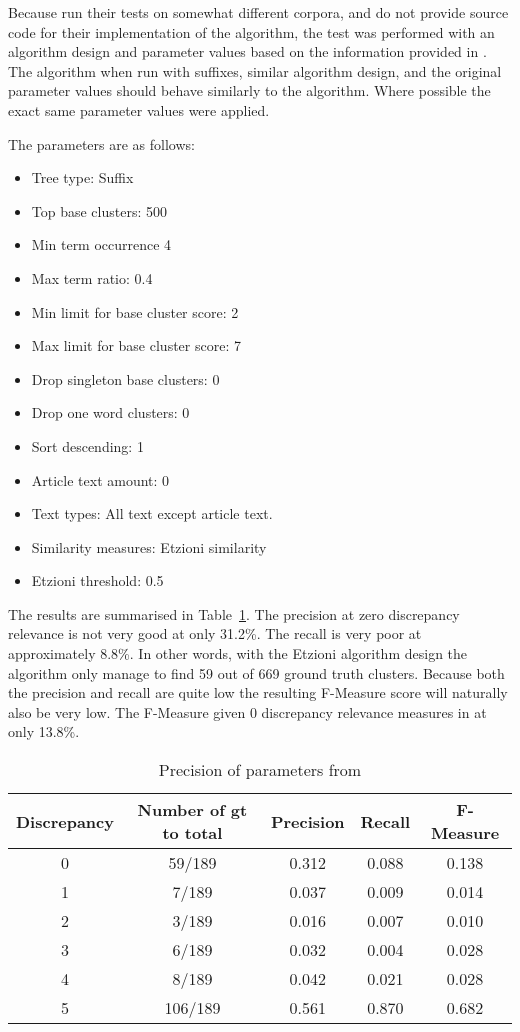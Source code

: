 Because \cite{Oren1998} run their tests on somewhat different corpora, and do not provide source code for their implementation of the \STC algorithm, the test was performed with an algorithm design and parameter values based on the information provided in . The \CTC algorithm when run with suffixes, similar algorithm design, and the original parameter values should behave similarly to the \STC algorithm. Where possible the exact same parameter values were applied.

The parameters are as follows:
\begin{itemize}
  \item Tree type: Suffix
  \item Top base clusters: 500
  \item Min term occurrence 4
  \item Max term ratio: 0.4
  \item Min limit for base cluster score: 2
  \item Max limit for base cluster score: 7
  \item Drop singleton base clusters: 0
  \item Drop one word clusters: 0
  \item Sort descending: 1
  \item Article text amount: 0
  \item Text types: All text except article text.
  \item Similarity measures: Etzioni similarity
  \item Etzioni threshold: 0.5
\end{itemize}

The results are summarised in Table~\ref{tab:etzioniparametersresults}. The precision at zero discrepancy relevance is not very good at only 31.2\%. The recall is very poor at approximately 8.8\%. In other words, with the Etzioni algorithm design the algorithm only manage to find 59 out of 669 ground truth clusters. Because both the precision and recall are quite low the resulting F-Measure score will naturally also be very low. The F-Measure given 0 discrepancy relevance measures in at only 13.8\%.

\begin{table}[H]
\begin{center}
\begin{tabular}{|c|c|ccc|}
\hline
Discrepancy & Number of gt to total & Precision  & Recall & F-Measure\\ 
\hline
0&   59/189&    0.312&   0.088&    0.138\\ 
1&    7/189&    0.037&   0.009&    0.014\\ 
2&    3/189&    0.016&   0.007&    0.010\\ 
3&    6/189&    0.032&   0.004&    0.028\\ 
4&    8/189&    0.042&   0.021&    0.028\\ 
5&   106/189&   0.561&   0.870&    0.682\\ 
\hline
\end{tabular}
\end{center}
\caption{Precision of parameters from \citeauthor{Oren1998}}
\label{tab:etzioniparametersresults}
\end{table}



